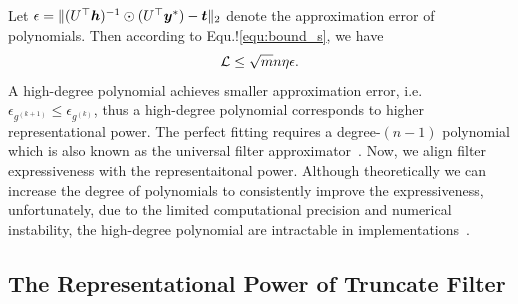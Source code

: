 \documentclass{article} %
\def\valpha{{\bm\alpha}}
\def\vlambda{{\bm\lambda}}
\newtheorem{proposition}{\textbf{Proposition}} %
\begin{document}
Let $\epsilon=\|(U^{\top}{\bm{h}})^{-1}\odot(U^{\top}{\bm{y}}^*)-{\bm{t}}\|_2$ denote the approximation error of polynomials.
Then according to Equ.!\ref{equ:bound_s}, we have
\begin{equation}
	\label{equ:bound_poly}
	\begin{aligned}
		{\mathcal{L}}\leq\sqrt{m}n\eta\epsilon.
	\end{aligned}
\end{equation}
A high-degree polynomial achieves smaller approximation error, i.e. $\epsilon_{g^{(k+1)}}\leq\epsilon_{g^{(k)}}$, thus a high-degree polynomial corresponds to higher representational power.
The perfect fitting requires a degree-$(n-1)$ polynomial which is also known as the universal filter approximator~\citep{he2021bernnet,yang2022spectrum,JacobiConv,bo2022specformer}.
Now, we align filter expressiveness with the representaitonal power.
Although theoretically we can increase the degree of polynomials to consistently improve the expressiveness, unfortunately, due to the limited computational precision and numerical instability, the high-degree polynomial are intractable in implementations~\citep{yang2022spectrum}.


\subsection{The Representational Power of Truncate Filter}
\end{document}
